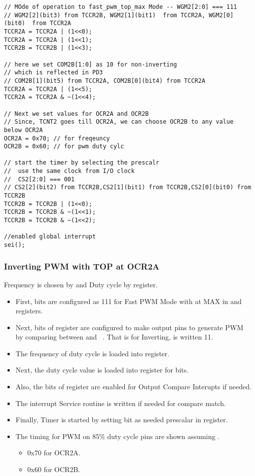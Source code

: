 \documentclass{article}
\begin{document}
\begin{verbatim}
// MOde of operation to fast_pwm_top_max Mode -- WGM2[2:0] === 111
// WGM2[2](bit3) from TCCR2B, WGM2[1](bit1)  from TCCR2A, WGM2[0](bit0)  from TCCR2A
TCCR2A = TCCR2A | (1<<0);
TCCR2A = TCCR2A | (1<<1);
TCCR2B = TCCR2B | (1<<3);	

// here we set COM2B[1:0] as 10 for non-inverting
// which is reflected in PD3
// COM2B[1](bit5) from TCCR2A, COM2B[0](bit4) from TCCR2A
TCCR2A = TCCR2A | (1<<5);
TCCR2A = TCCR2A & ~(1<<4);

// Next we set values for OCR2A and OCR2B
// Since, TCNT2 goes till OCR2A, we can choose OCR2B to any value below OCR2A
OCR2A = 0x70; // for freqeuncy
OCR2B = 0x60; // for pwm duty cylc

// start the timer by selecting the prescalr
//  use the same clock from I/O clock
//  CS2[2:0] === 001
// CS2[2](bit2) from TCCR2B,CS2[1](bit1) from TCCR2B,CS2[0](bit0) from TCCR2B
TCCR2B = TCCR2B | (1<<0);
TCCR2B = TCCR2B & ~(1<<1);
TCCR2B = TCCR2B & ~(1<<2);

//enabled global interrupt
sei();
\end{verbatim}

\subsubsection{Inverting PWM with TOP at  OCR2A}
\quad Frequency is chosen by  and Duty cycle by  register.
\begin{itemize}
    \item First,  bits are configured as 111 for Fast PWM Mode with  at MAX in  and  registers.
    \item Next,  bits of  register are configured to make output  pins to generate PWM by comparing between  and \ . That is for Inverting,  is written 11.
    \item The frequency of duty cycle is loaded into  register.
    \item Next, the duty cycle value is loaded into  register for  bits.
    \item Also, the  bits of  register  are enabled for Output Compare Interupts if needed.
    \item The interrupt Service routine is written if needed for compare match.
    \item Finally, Timer is started by setting  bit as needed prescalar in  register.
    \item The timing for PWM on 85\% duty cycle  pins are shown assuming .
    \begin{itemize}
        \item 0x70 for OCR2A.
        \item 0x60 for OCR2B.
    \end{itemize}
\end{itemize}
\end{document}
